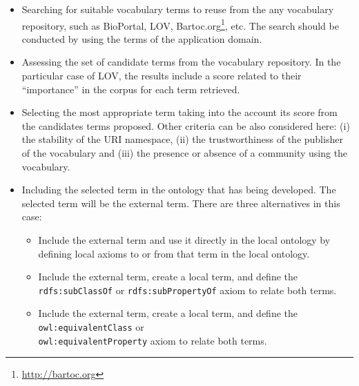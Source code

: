 \begin{itemize}
	\item Searching for suitable vocabulary terms to reuse from the any vocabulary repository, such as BioPortal, LOV, Bartoc.org\footnote{\url{http://bartoc.org}}, etc. The search should be conducted by using the terms of the application domain.
	\item Assessing the set of candidate terms from the vocabulary repository. In the particular case of LOV, the results include a score related to their ``importance'' in the corpus for each term retrieved.
	\item Selecting the most appropriate term taking into the account its score from the candidates terms proposed. Other criteria can be also considered here: (i) the stability of the URI namespace, (ii) the trustworthiness of the publisher of the vocabulary and (iii) the presence or absence of a community using the vocabulary.
	\item Including the selected term in the ontology that has being developed. The selected term will be the external term. There are three alternatives in this case: 
	\begin{itemize}
		\item Include the external term and use it directly in the local ontology by defining local axioms to or from that term in the local ontology.
		\item Include the external term, create a local term, and define the {\tt rdfs:subClassOf} or {\tt rdfs:subPropertyOf} axiom to relate both terms.
		\item Include the external term, create a local term, and define the {\tt owl:equivalentClass} or \\ {\tt owl:equivalentProperty} axiom to relate both terms. 				
	\end{itemize}
\end{itemize}


